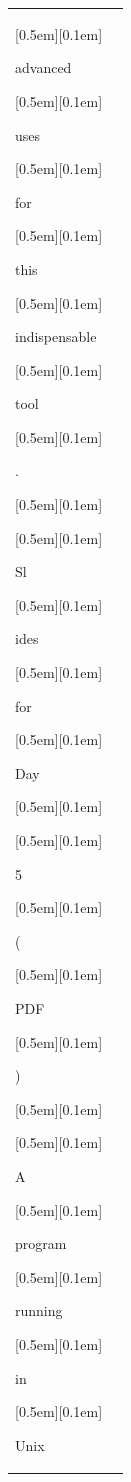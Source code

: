 \begin{table}[ht]
\begin{tabular}{@{}l p{13cm}@{}}
{\setlength{\fboxsep}{1pt}\raisebox{0pt}[0.5em][0.1em]{\colorbox{Salmon!60}{\strut{ advanced}}}}{\setlength{\fboxsep}{1pt}\raisebox{0pt}[0.5em][0.1em]{\colorbox{DarkOrchid!25}{\strut{ uses}}}}{\setlength{\fboxsep}{1pt}\raisebox{0pt}[0.5em][0.1em]{\colorbox{SkyBlue!55}{\strut{ for}}}}{\setlength{\fboxsep}{1pt}\raisebox{0pt}[0.5em][0.1em]{\colorbox{SkyBlue!55}{\strut{ this}}}}{\setlength{\fboxsep}{1pt}\raisebox{0pt}[0.5em][0.1em]{\colorbox{Salmon!60}{\strut{ indispensable}}}}{\setlength{\fboxsep}{1pt}\raisebox{0pt}[0.5em][0.1em]{\colorbox{DarkOrchid!25}{\strut{ tool}}}}{\setlength{\fboxsep}{1pt}\raisebox{0pt}[0.5em][0.1em]{\colorbox{DarkOrchid!25}{\strut{.}}}}{\setlength{\fboxsep}{1pt}\raisebox{0pt}[0.5em][0.1em]{\colorbox{DarkOrchid!25}{\strut{ }}}}{\setlength{\fboxsep}{1pt}\raisebox{0pt}[0.5em][0.1em]{\colorbox{DarkOrchid!25}{\strut{Sl}}}}{\setlength{\fboxsep}{1pt}\raisebox{0pt}[0.5em][0.1em]{\colorbox{Salmon!60}{\strut{ides}}}}{\setlength{\fboxsep}{1pt}\raisebox{0pt}[0.5em][0.1em]{\colorbox{SkyBlue!55}{\strut{ for}}}}{\setlength{\fboxsep}{1pt}\raisebox{0pt}[0.5em][0.1em]{\colorbox{Salmon!60}{\strut{ Day}}}}{\setlength{\fboxsep}{1pt}\raisebox{0pt}[0.5em][0.1em]{\colorbox{DarkOrchid!25}{\strut{ }}}}{\setlength{\fboxsep}{1pt}\raisebox{0pt}[0.5em][0.1em]{\colorbox{Salmon!60}{\strut{5}}}}{\setlength{\fboxsep}{1pt}\raisebox{0pt}[0.5em][0.1em]{\colorbox{SkyBlue!55}{\strut{ (}}}}{\setlength{\fboxsep}{1pt}\raisebox{0pt}[0.5em][0.1em]{\colorbox{Salmon!60}{\strut{PDF}}}}{\setlength{\fboxsep}{1pt}\raisebox{0pt}[0.5em][0.1em]{\colorbox{DarkOrchid!25}{\strut{)}}}}{\setlength{\fboxsep}{1pt}\raisebox{0pt}[0.5em][0.1em]{\colorbox{DarkOrchid!25}{\strut{ }}}}{\setlength{\fboxsep}{1pt}\raisebox{0pt}[0.5em][0.1em]{\colorbox{SkyBlue!55}{\strut{A}}}}{\setlength{\fboxsep}{1pt}\raisebox{0pt}[0.5em][0.1em]{\colorbox{Salmon!60}{\strut{ program}}}}{\setlength{\fboxsep}{1pt}\raisebox{0pt}[0.5em][0.1em]{\colorbox{DarkOrchid!25}{\strut{ running}}}}{\setlength{\fboxsep}{1pt}\raisebox{0pt}[0.5em][0.1em]{\colorbox{SkyBlue!55}{\strut{ in}}}}{\setlength{\fboxsep}{1pt}\raisebox{0pt}[0.5em][0.1em]{\colorbox{Salmon!60}{\strut{ Unix}}}} \\


\end{tabular}
\end{table}
